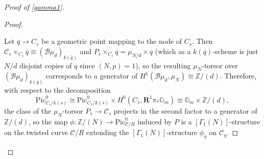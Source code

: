 \documentclass[11pt]{amsart}
\theoremstyle{definition}
\begin{document}
\begin{proof}[Proof of \ref{gamma1}]
\begin{proof}
\begin{center}
\end{center}
Let $\overline{q} \rightarrow C_{\overline{s}}$ be a geometric point mapping to the node of $C_{\overline{s}}$. Then ${\mathcal{C}}_{\overline{s}} \times_{C_{\overline{s}}} \overline{q} \cong ({\mathcal{B}}\mu_d)_{k(\overline{q})}$ and $P_{\overline{s}} \times_{C_{\overline{s}}} \overline{q} = \mu_{N/d} \times \overline{q}$ (which as a $k(\overline{q})$-scheme is just $N/d$ disjoint copies of $\overline{q}$ since $(N,p) = 1$), so the resulting $\mu_N$-torsor over $({\mathcal{B}}\mu_d)_{k(\overline{q})}$ corresponds to a generator of $H^1({\mathcal{B}}\mu_d,\mu_N) \cong \mathbb{Z}/(d)$. Therefore, with respect to the decomposition 
\begin{displaymath}
\mathrm{Pic}^0_{{\mathcal{C}}_{\overline{s}}/k(\overline{s})} \cong \mathrm{Pic}^0_{C_{\overline{s}}/k(\overline{s})} \times H^0(C_{\overline{s}}, \mathbf{R}^1\pi_*\mathbb{G}_m) \cong \mathbb{G}_m \times \mathbb{Z}/(d),
\end{displaymath}
the class of the $\mu_N$-torsor $P_{\overline{s}} \rightarrow {\mathcal{C}}_{\overline{s}}$ projects in the second factor to a generator of $\mathbb{Z}/(d)$, so the map $\phi: \mathbb{Z}/(N) \rightarrow \mathrm{Pic}^0_{{\mathcal{C}}/R}$ induced by $P$ is a $[\Gamma_1(N)]$-structure on the twisted curve ${\mathcal{C}}/R$ extending the $[\Gamma_1(N)]$-structure $\phi_\eta$ on ${\mathcal{C}}_\eta$.


\end{proof}
\end{proof}
\end{document}
